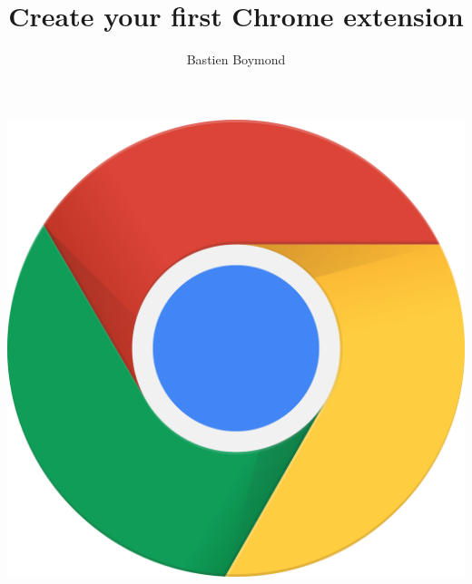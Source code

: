 \documentclass{article}
\title{Create your first Chrome extension}
\author{Bastien Boymond}
\date{}
\begin{document}
    \maketitle
    \begin{center}
        \includegraphics[scale=0.1]{../images/chromeExtension.png}
    \end{center}
    \newpage
\end{document}

